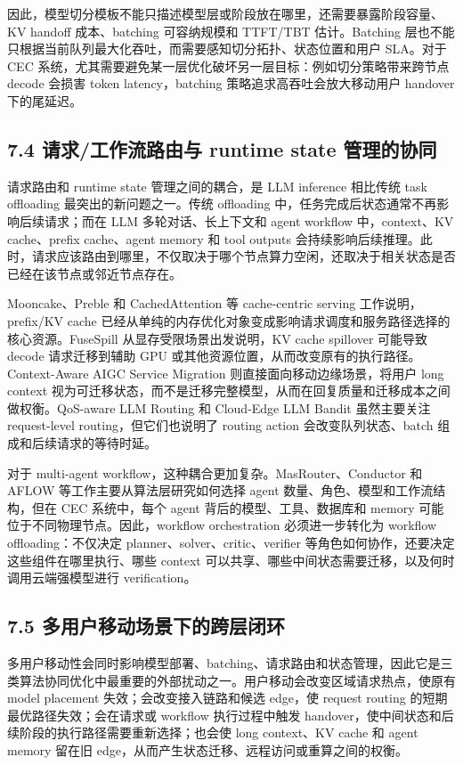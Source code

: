 \documentclass[a4paper,twocolumn,10pt]{ctexart}
\begin{document}
因此，模型切分模板不能只描述模型层或阶段放在哪里，还需要暴露阶段容量、KV handoff 成本、batching 可容纳规模和 TTFT/TBT 估计。Batching 层也不能只根据当前队列最大化吞吐，而需要感知切分拓扑、状态位置和用户 SLA。对于 CEC 系统，尤其需要避免某一层优化破坏另一层目标：例如切分策略带来跨节点 decode 会损害 token latency，batching 策略追求高吞吐会放大移动用户 handover 下的尾延迟。


\subsection{7.4 请求/工作流路由与 runtime state 管理的协同}

请求路由和 runtime state 管理之间的耦合，是 LLM inference 相比传统 task offloading 最突出的新问题之一。传统 offloading 中，任务完成后状态通常不再影响后续请求；而在 LLM 多轮对话、长上下文和 agent workflow 中，context、KV cache、prefix cache、agent memory 和 tool outputs 会持续影响后续推理。此时，请求应该路由到哪里，不仅取决于哪个节点算力空闲，还取决于相关状态是否已经在该节点或邻近节点存在。


Mooncake、Preble 和 CachedAttention 等 cache-centric serving 工作说明，prefix/KV cache 已经从单纯的内存优化对象变成影响请求调度和服务路径选择的核心资源。FuseSpill 从显存受限场景出发说明，KV cache spillover 可能导致 decode 请求迁移到辅助 GPU 或其他资源位置，从而改变原有的执行路径。Context-Aware AIGC Service Migration 则直接面向移动边缘场景，将用户 long context 视为可迁移状态，而不是迁移完整模型，从而在回复质量和迁移成本之间做权衡。QoS-aware LLM Routing 和 Cloud-Edge LLM Bandit 虽然主要关注 request-level routing，但它们也说明了 routing action 会改变队列状态、batch 组成和后续请求的等待时延。


对于 multi-agent workflow，这种耦合更加复杂。MasRouter、Conductor 和 AFLOW 等工作主要从算法层研究如何选择 agent 数量、角色、模型和工作流结构，但在 CEC 系统中，每个 agent 背后的模型、工具、数据库和 memory 可能位于不同物理节点。因此，workflow orchestration 必须进一步转化为 workflow offloading：不仅决定 planner、solver、critic、verifier 等角色如何协作，还要决定这些组件在哪里执行、哪些 context 可以共享、哪些中间状态需要迁移，以及何时调用云端强模型进行 verification。


\subsection{7.5 多用户移动场景下的跨层闭环}

多用户移动性会同时影响模型部署、batching、请求路由和状态管理，因此它是三类算法协同优化中最重要的外部扰动之一。用户移动会改变区域请求热点，使原有 model placement 失效；会改变接入链路和候选 edge，使 request routing 的短期最优路径失效；会在请求或 workflow 执行过程中触发 handover，使中间状态和后续阶段的执行路径需要重新选择；也会使 long context、KV cache 和 agent memory 留在旧 edge，从而产生状态迁移、远程访问或重算之间的权衡。
\end{document}

